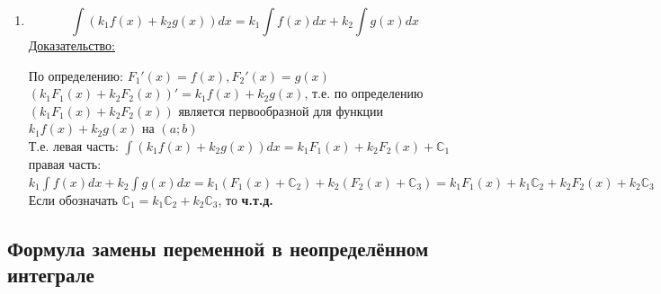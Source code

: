 \documentclass[12pt]{article}
\begin{document}
\begin{enumerate}
\begin{adjustwidth}{1.5em}{1.5em}
            Если обозначать $C_1 = kC_2$, то \textbf{ч.т.д.}
        \end{adjustwidth}
        \item \[ \int (k_1 f(x) + k_2 g(x))dx = k_1 \int f(x)dx + k_2 \int g(x)dx \]
        \underline{Доказательство:}
        \begin{adjustwidth}{1.5em}{1.5em}
            По определению: $F_1'(x) = f(x), F_2'(x) = g(x)$\\
            $(k_1F_1(x) + k_2F_2(x))' = k_1f(x) + k_2g(x)$, т.е. по определению $(k_1F_1(x) + k_2F_2(x))$ является первообразной для функции $k_1f(x) + k_2g(x)$ на $(a; b)$\\
            Т.е. левая часть: $\int (k_1f(x) + k_2g(x))dx = k_1F_1(x) + k_2F_2(x) + \mathbb{C}_1$\\
            правая часть: $k_1\int f(x)dx + k_2\int g(x)dx = k_1(F_1(x) + \mathbb{C}_2) + k_2(F_2(x) + \mathbb{C}_3) = k_1F_1(x) + k_1\mathbb{C}_2 + k_2F_2(x) + k_2\mathbb{C}_3$\\
            Если обозначать $\mathbb{C}_1 = k_1\mathbb{C}_2 + k_2\mathbb{C}_3$, то \textbf{ч.т.д.}
        \end{adjustwidth}
    \end{enumerate}

    \subsection{Формула замены переменной в неопределённом интеграле}
\end{document}
